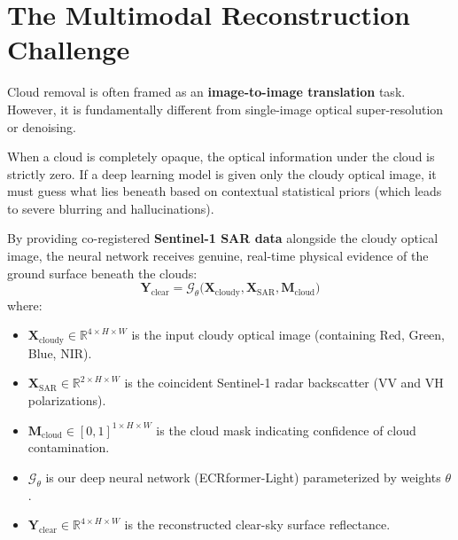 \section{The Multimodal Reconstruction Challenge}
Cloud removal is often framed as an \textbf{image-to-image translation} task. However, it is fundamentally different from single-image optical super-resolution or denoising. 

When a cloud is completely opaque, the optical information under the cloud is strictly zero. If a deep learning model is given only the cloudy optical image, it must guess what lies beneath based on contextual statistical priors (which leads to severe blurring and hallucinations). 

By providing co-registered \textbf{Sentinel-1 SAR data} alongside the cloudy optical image, the neural network receives genuine, real-time physical evidence of the ground surface beneath the clouds:
\begin{equation}
\mathbf{Y}_{\text{clear}} = \mathcal{G}_{\theta}\big(\mathbf{X}_{\text{cloudy}}, \mathbf{X}_{\text{SAR}}, \mathbf{M}_{\text{cloud}}\big)
\end{equation}
where:
\begin{itemize}
    \item $\mathbf{X}_{\text{cloudy}} \in \mathbb{R}^{4 \times H \times W}$ is the input cloudy optical image (containing Red, Green, Blue, NIR).
    \item $\mathbf{X}_{\text{SAR}} \in \mathbb{R}^{2 \times H \times W}$ is the coincident Sentinel-1 radar backscatter (VV and VH polarizations).
    \item $\mathbf{M}_{\text{cloud}} \in [0, 1]^{1 \times H \times W}$ is the cloud mask indicating confidence of cloud contamination.
    \item $\mathcal{G}_{\theta}$ is our deep neural network (ECRformer-Light) parameterized by weights $\theta$.
    \item $\mathbf{Y}_{\text{clear}} \in \mathbb{R}^{4 \times H \times W}$ is the reconstructed clear-sky surface reflectance.
\end{itemize}

